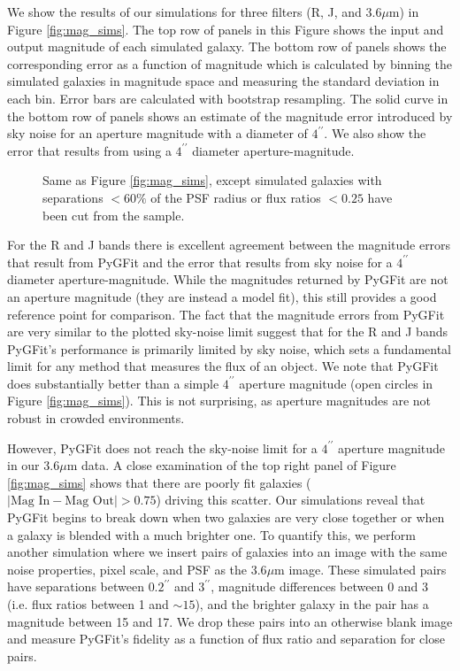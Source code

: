 \documentclass[apj]{emulateapj}
\newcommand{\pygfit}{PyGFit}
\begin{document}
We show the results of our simulations for three filters (R, J, and $3.6\mu$m) in Figure \ref{fig:mag_sims}.  The top row of panels in this Figure shows the input and output magnitude of each simulated galaxy.  The bottom row of panels shows the corresponding error as a function of magnitude which is calculated by binning the simulated galaxies in magnitude space and measuring the standard deviation in each bin.  Error bars are calculated with bootstrap resampling.  The solid curve in the bottom row of panels shows an estimate of the magnitude error introduced by sky noise for an aperture magnitude with a diameter of $4^{\prime\prime}$.  We also show the error that results from using a $4^{\prime\prime}$ diameter aperture-magnitude.

\begin{figure*}
\caption{Same as Figure \ref{fig:mag_sims}, except simulated galaxies with separations $<60\%$ of the PSF radius or flux ratios $<0.25$ have been cut from the sample.}\label{fig:mag_sims_cut}
\end{figure*}

For the R and J bands there is excellent agreement between the magnitude errors that result from \pygfit{} and the error that results from sky noise for a $4^{\prime\prime}$ diameter aperture-magnitude.  While the magnitudes returned by \pygfit{} are not an aperture magnitude (they are instead a model fit), this still provides a good reference point for comparison.  The fact that the magnitude errors from \pygfit{} are very similar to the plotted sky-noise limit suggest that for the R and J bands \pygfit{}'s performance is primarily limited by sky noise, which sets a fundamental limit for any method that measures the flux of an object.  We note that \pygfit{} does substantially better than a simple $4^{\prime\prime}$ aperture magnitude (open circles in Figure \ref{fig:mag_sims}).  This is not surprising, as aperture magnitudes are not robust in crowded environments.

However, \pygfit{} does not reach the sky-noise limit for a $4^{\prime\prime}$ aperture magnitude in our $3.6\mu$m data.  A close examination of the top right panel of Figure \ref{fig:mag_sims} shows that there are poorly fit galaxies ($|\textrm{Mag In} - \textrm{Mag Out}| > 0.75$) driving this scatter.  Our simulations reveal that \pygfit{} begins to break down when two galaxies are very close together or when a galaxy is blended with a much brighter one.  To quantify this, we perform another simulation where we insert pairs of galaxies into an image with the same noise properties, pixel scale, and PSF as the $3.6\mu$m image.  These simulated pairs have separations between $0.2^{\prime\prime}$ and $3^{\prime\prime}$, magnitude differences between 0 and 3 (i.e. flux ratios between 1 and $\sim15$), and the brighter galaxy in the pair has a magnitude between 15 and 17.  We drop these pairs into an otherwise blank image and measure \pygfit{}'s fidelity as a function of flux ratio and separation for close pairs.
\end{document}
